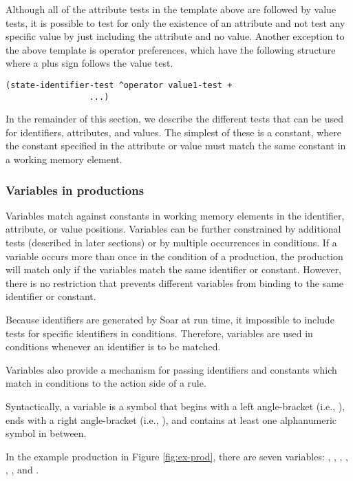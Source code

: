 Although all of the attribute tests in the template above are followed
by value tests, it is possible to test for only the existence of an
attribute and not test any specific value by just including the
attribute and no value.  Another exception to the above template is
operator preferences, which have the following structure where a plus
sign follows the value test.
\begin{verbatim}
(state-identifier-test ^operator value1-test +
                 ...)
\end{verbatim}

In the remainder of this section, we describe the different tests that
can be used for identifiers, attributes, and values.  The simplest of
these is a constant, where the constant specified in the attribute or
value must match the same constant in a working memory element.

\subsubsection{Variables in productions}
\label{SYNTAX-pm-variables}

Variables match against constants in working memory elements in the
identifier, attribute, or value positions.  Variables can be further
constrained by additional tests (described in later sections) or by
multiple occurrences in conditions.  If a variable occurs more than once
in the condition of a production, the production will match only if the
variables match the same identifier or constant.  However, there is no
restriction that prevents different variables from binding to the same
identifier or constant.

Because identifiers are generated by Soar at run time, it impossible to
include tests for specific identifiers in conditions.  Therefore,
variables are used in conditions whenever an identifier is to be
matched.

Variables also provide a mechanism for passing identifiers and constants
which match in conditions to the action side of a rule.

Syntactically, a variable is a symbol that begins with
a left angle-bracket (i.e., \soar{<}), ends with a right angle-bracket (i.e.,
\soar{>}), and contains at least one alphanumeric symbol in between.

In the example production in Figure \ref{fig:ex-prod}, there are seven
variables: , , , ,
, , and .

